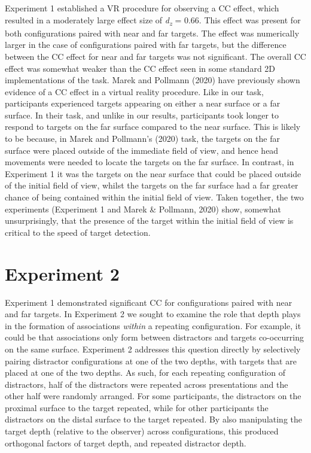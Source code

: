 \documentclass[
  english,
  man,floatsintext]{apa7}
\begin{document}
Experiment 1 established a VR procedure for observing a CC effect, which resulted in a moderately large effect size of \emph{d\textsubscript{z}} = 0.66. This effect was present for both configurations paired with near and far targets. The effect was numerically larger in the case of configurations paired with far targets, but the difference between the CC effect for near and far targets was not significant. The overall CC effect was somewhat weaker than the CC effect seen in some standard 2D implementations of the task. Marek and Pollmann (2020) have previously shown evidence of a CC effect in a virtual reality procedure. Like in our task, participants experienced targets appearing on either a near surface or a far surface. In their task, and unlike in our results, participants took longer to respond to targets on the far surface compared to the near surface. This is likely to be because, in Marek and Pollmann's (2020) task, the targets on the far surface were placed outside of the immediate field of view, and hence head movements were needed to locate the targets on the far surface. In contrast, in Experiment 1 it was the targets on the near surface that could be placed outside of the initial field of view, whilst the targets on the far surface had a far greater chance of being contained within the initial field of view. Taken together, the two experiments (Experiment 1 and Marek \& Pollmann, 2020) show, somewhat unsurprisingly, that the presence of the target within the initial field of view is critical to the speed of target detection.

\hypertarget{experiment-2}{%
\section{Experiment 2}\label{experiment-2}}

Experiment 1 demonstrated significant CC for configurations paired with near and far targets. In Experiment 2 we sought to examine the role that depth plays in the formation of associations \emph{within} a repeating configuration. For example, it could be that associations only form between distractors and targets co-occurring on the same surface. Experiment 2 addresses this question directly by selectively pairing distractor configurations at one of the two depths, with targets that are placed at one of the two depths. As such, for each repeating configuration of distractors, half of the distractors were repeated across presentations and the other half were randomly arranged. For some participants, the distractors on the proximal surface to the target repeated, while for other participants the distractors on the distal surface to the target repeated. By also manipulating the target depth (relative to the observer) across configurations, this produced orthogonal factors of target depth, and repeated distractor depth.
\end{document}
